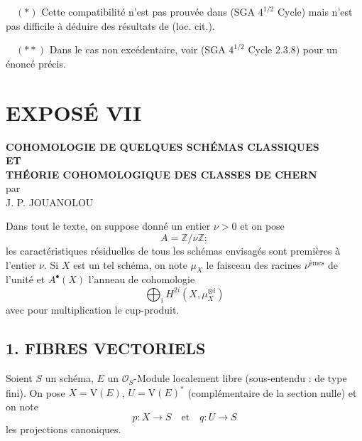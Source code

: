 \documentclass[11pt]{article}
\providecommand{\V}{\mathrm V}
\begin{document}
\begin{flushleft}
\(\quad (*)\) Cette compatibilité n'est pas prouvée dans (SGA \(4^{1/2}\) Cycle) mais n'est pas difficile à déduire des résultats de (loc. cit.).

\(\quad (**)\) Dans le cas non excédentaire, voir (SGA \(4^{1/2}\) Cycle 2.3.8) pour un énoncé précis.
\end{flushleft}


\section*{EXPOSÉ VII}

\begin{center}
\textbf{COHOMOLOGIE DE QUELQUES SCHÉMAS CLASSIQUES}\\[0.5em]
\textbf{ET}\\[0.5em]
\textbf{THÉORIE COHOMOLOGIQUE DES CLASSES DE CHERN}\\[1em]
par\\[0.5em]
J. P. JOUANOLOU
\end{center}

Dans tout le texte, on suppose donné un entier $\nu>0$ et on pose
\[
A=\mathbb Z/\nu\mathbb Z;
\]
les caractéristiques résiduelles de tous les schémas envisagés sont premières à l'entier $\nu$. Si $X$ est un tel schéma, on note $\mu_X$ le faisceau des racines $\nu^{\text{èmes}}$ de l'unité et $A^{\bullet}(X)$ l'anneau de cohomologie
\[
\bigoplus_i H^{2i}(X,\mu_X^{\otimes i})
\]
avec pour multiplication le cup-produit.

\subsection*{1. FIBRES VECTORIELS}

Soient $S$ un schéma, $E$ un $\mathcal O_S$-Module localement libre (sous-entendu : de type fini). On pose $X=\V(E)$, $U=\V(E)^*$ (complémentaire de la section nulle) et on
note
\[
p:X\to S
\quad\text{et}\quad
q:U\to S
\]
les projections canoniques.
\end{document}
